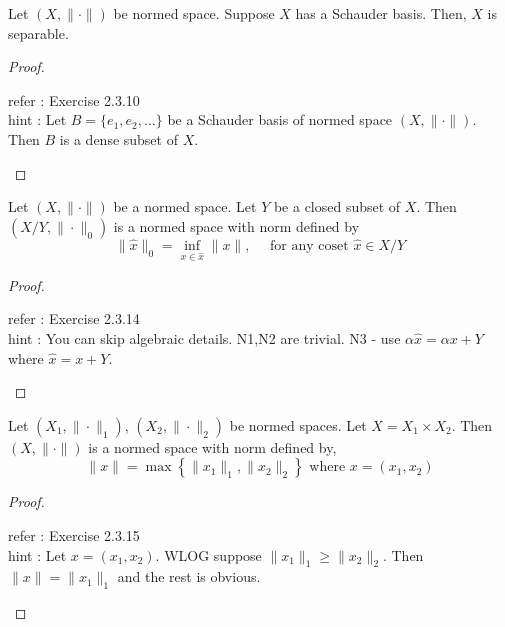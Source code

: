 \begin{lemma}[separable]
	Let $(X,\|\cdot\|)$ be normed space.
	Suppose $X$ has a Schauder basis.
	Then, $X$ is separable.
\end{lemma}
\begin{proof}
\begin{important}
	refer : Exercise 2.3.10\\
	hint : Let $B = \{ e_1,e_2, \dots \}$ be a Schauder basis of normed space $(X,\|\cdot\|)$. Then $B$ is a dense subset of $X$.
\end{important}
\end{proof}

\begin{lemma}
	Let $(X,\| \cdot \|)$ be a normed space.
	Let $Y$ be a closed subset of $X$.
	Then $(X/Y,\|\cdot\|_0)$ is a normed space with norm defined by
	\[ \|\hat{x}\|_0 = \inf_{x \in \hat{x}} \| x \|, \quad \text{ for any coset } \hat{x} \in X/Y \]
\end{lemma}
\begin{proof}
\begin{important}
	refer : Exercise 2.3.14\\
	hint : You can skip algebraic details. N1,N2 are trivial. N3 - use $\alpha \hat{x} = \alpha x + Y$ where $\hat{x} = x+Y$.
\end{important}
\end{proof}
\begin{lemma}
	Let $(X_1,\|\cdot\|_1)$, $(X_2,\|\cdot\|_2)$ be normed spaces.
	Let $X = X_1 \times X_2$.
	Then $(X,\|\cdot\|)$ is a normed space with norm defined by,
	\[ \| x \| = \max \left\{ \|x_1\|_1,\|x_2\|_2 \right\} \text{ where } x = (x_1,x_2) \]
\end{lemma}
\begin{proof}
\begin{important}
	refer : Exercise 2.3.15\\
	hint : Let $x = (x_1,x_2)$. WLOG suppose $\|x_1\|_1 \ge \|x_2\|_2$. Then $\| x \| = \| x_1 \|_1$ and the rest is obvious.
\end{important}
\end{proof}

